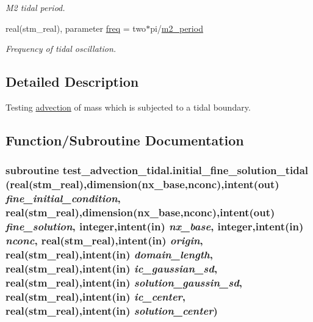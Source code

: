 \begin{CompactItemize}
\begin{CompactList}\small\item\em M2 tidal period. \item\end{CompactList}\item 
\hypertarget{a00075_685c107d67e4166e5c47350e344ff0e1}{
real(stm\_\-real), parameter \hyperlink{a00075_685c107d67e4166e5c47350e344ff0e1}{freq} = two$\ast$pi/\hyperlink{a00075_7069493925339bc094dc5d9e66a6ca3e}{m2\_\-period}}
\label{a00075_685c107d67e4166e5c47350e344ff0e1}

\begin{CompactList}\small\item\em Frequency of tidal oscillation. \item\end{CompactList}\end{CompactItemize}


\subsection{Detailed Description}
Testing \hyperlink{a00052}{advection} of mass which is subjected to a tidal boundary. 



\subsection{Function/Subroutine Documentation}
\hypertarget{a00075_274a3add96450377dc8a8b3a940b9b92}{
\subsubsection[{initial\_\-fine\_\-solution\_\-tidal}]{\setlength{\rightskip}{0pt plus 5cm}subroutine test\_\-advection\_\-tidal.initial\_\-fine\_\-solution\_\-tidal (real(stm\_\-real),dimension(nx\_\-base,nconc),intent(out) {\em fine\_\-initial\_\-condition}, \/  real(stm\_\-real),dimension(nx\_\-base,nconc),intent(out) {\em fine\_\-solution}, \/  integer,intent(in) {\em nx\_\-base}, \/  integer,intent(in) {\em nconc}, \/  real(stm\_\-real),intent(in) {\em origin}, \/  real(stm\_\-real),intent(in) {\em domain\_\-length}, \/  real(stm\_\-real),intent(in) {\em ic\_\-gaussian\_\-sd}, \/  real(stm\_\-real),intent(in) {\em solution\_\-gaussin\_\-sd}, \/  real(stm\_\-real),intent(in) {\em ic\_\-center}, \/  real(stm\_\-real),intent(in) {\em solution\_\-center})}}
\label{a00075_274a3add96450377dc8a8b3a940b9b92}


